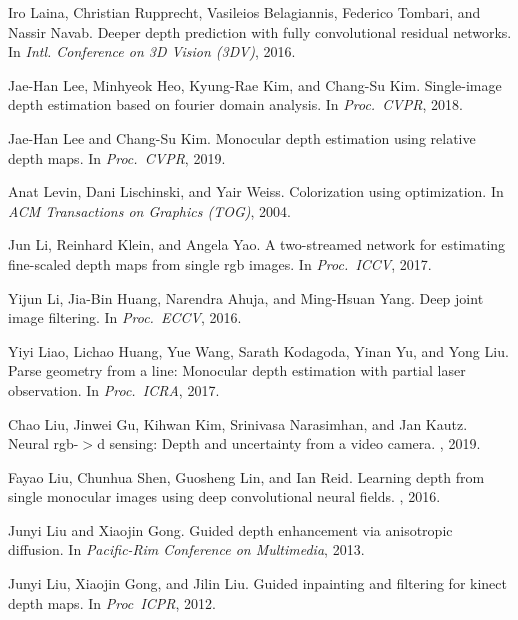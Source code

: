 \documentclass[10pt,twocolumn,letterpaper]{article}
\begin{document}
{\begin{thebibliography}{10}
Iro Laina, Christian Rupprecht, Vasileios Belagiannis, Federico Tombari, and
  Nassir Navab.
\newblock Deeper depth prediction with fully convolutional residual networks.
\newblock In {\em Intl. Conference on 3D Vision (3DV)}, 2016.

Jae-Han Lee, Minhyeok Heo, Kyung-Rae Kim, and Chang-Su Kim.
\newblock Single-image depth estimation based on fourier domain analysis.
\newblock In {\em Proc.~CVPR}, 2018.

Jae-Han Lee and Chang-Su Kim.
\newblock Monocular depth estimation using relative depth maps.
\newblock In {\em Proc.~CVPR}, 2019.

Anat Levin, Dani Lischinski, and Yair Weiss.
\newblock Colorization using optimization.
\newblock In {\em ACM Transactions on Graphics (TOG)}, 2004.

Jun Li, Reinhard Klein, and Angela Yao.
\newblock A two-streamed network for estimating fine-scaled depth maps from
  single rgb images.
\newblock In {\em Proc.~ICCV}, 2017.

Yijun Li, Jia-Bin Huang, Narendra Ahuja, and Ming-Hsuan Yang.
\newblock Deep joint image filtering.
\newblock In {\em Proc.~ECCV}, 2016.

Yiyi Liao, Lichao Huang, Yue Wang, Sarath Kodagoda, Yinan Yu, and Yong Liu.
\newblock Parse geometry from a line: Monocular depth estimation with partial
  laser observation.
\newblock In {\em Proc.~ICRA}, 2017.

Chao Liu, Jinwei Gu, Kihwan Kim, Srinivasa Narasimhan, and Jan Kautz.
\newblock Neural rgb-$>$d sensing: Depth and uncertainty from a video camera.
, 2019.

Fayao Liu, Chunhua Shen, Guosheng Lin, and Ian Reid.
\newblock Learning depth from single monocular images using deep convolutional
  neural fields.
, 2016.

Junyi Liu and Xiaojin Gong.
\newblock Guided depth enhancement via anisotropic diffusion.
\newblock In {\em Pacific-Rim Conference on Multimedia}, 2013.

Junyi Liu, Xiaojin Gong, and Jilin Liu.
\newblock Guided inpainting and filtering for kinect depth maps.
\newblock In {\em Proc~ICPR}, 2012.


\end{thebibliography}}
\end{document}
